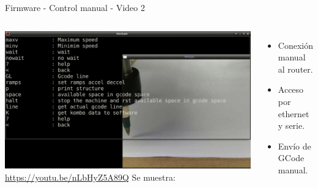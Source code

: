 \documentclass[aspectratio= 43]{beamer}
\begin{document}
\begin{frame}{Firmware - Control manual - Video 2}
   \begin{columns}
   \href{run:./videos/video2.mp4}{
      \includegraphics[width=\textwidth, left]{./videos/shot0002.jpg}
   }
   \href{https://youtu.be/nLbHyZ5A89Q}{https://youtu.be/nLbHyZ5A89Q}
      Se muestra:
      \begin{itemize}
         \item{Conexión manual al router.}
         \item{Acceso por ethernet y serie.}
         \item{Envío de GCode manual.}
      \end{itemize}
   \end{columns}
\end{frame}
\end{document}
